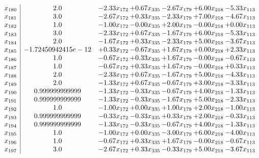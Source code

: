 \documentclass[8pt]{article}
\begin{document}
\[\begin{array}{c| c c@{\hskip 2pt} c@{\hskip 2pt} c@{\hskip 2pt} c@{\hskip 2pt} c@{\hskip 2pt} }
 x_{180}   &  2.0 & -2.33 x_{172} & +  0.67 x_{335} & -2.67 x_{179} & +  6.00 x_{218} & -5.33 x_{113}\\
 x_{181}   &  3.0 & -2.67 x_{172} & +  0.33 x_{335} & -2.33 x_{179} & +  7.00 x_{218} & -4.67 x_{113}\\
 x_{182}   &  1.0 & -1.00 x_{172} & -0.00 x_{335} & +  2.00 x_{179} & -0.00 x_{218} & +  0.00 x_{113}\\
 x_{183}   &  3.0 & -2.33 x_{172} & +  0.67 x_{335} & -1.67 x_{179} & +  6.00 x_{218} & -5.33 x_{113}\\
 x_{184}   &  2.0 & -1.67 x_{172} & +  0.33 x_{335} & -2.33 x_{179} & +  5.00 x_{218} & -3.67 x_{113}\\
 x_{185}   &  -1.72450942415e-12 & +  0.33 x_{172} & -0.67 x_{335} & +  1.67 x_{179} & +  0.00 x_{218} & +  2.33 x_{113}\\
 x_{186}   &  1.0 & -0.67 x_{172} & +  0.33 x_{335} & +  1.67 x_{179} & -0.00 x_{218} & -0.67 x_{113}\\
 x_{187}   &  1.0 & -0.67 x_{172} & +  0.33 x_{335} & +  1.67 x_{179} & -0.00 x_{218} & +  0.33 x_{113}\\
 x_{188}   &  2.0 & -2.33 x_{172} & +  0.67 x_{335} & -1.67 x_{179} & +  5.00 x_{218} & -4.33 x_{113}\\
 x_{189}   &  2.0 & -1.33 x_{172} & +  0.67 x_{335} & -0.67 x_{179} & +  3.00 x_{218} & -3.33 x_{113}\\
 x_{190}   &  0.999999999999 & -1.33 x_{172} & -0.33 x_{335} & -0.67 x_{179} & +  4.00 x_{218} & -1.33 x_{113}\\
 x_{191}   &  0.999999999999 & -1.33 x_{172} & -0.33 x_{335} & -1.67 x_{179} & +  5.00 x_{218} & -2.33 x_{113}\\
 x_{192}   &  1.0 & -1.00 x_{172} & +  0.00 x_{335} & +  1.00 x_{179} & +  2.00 x_{218} & -1.00 x_{113}\\
 x_{193}   &  0.999999999999 & -0.33 x_{172} & -0.33 x_{335} & +  0.33 x_{179} & +  2.00 x_{218} & -0.33 x_{113}\\
 x_{194}   &  0.999999999999 & -1.33 x_{172} & -0.33 x_{335} & -0.67 x_{179} & +  4.00 x_{218} & -1.33 x_{113}\\
 x_{195}   &  1.0 & -1.00 x_{172} & +  0.00 x_{335} & -3.00 x_{179} & +  6.00 x_{218} & -4.00 x_{113}\\
 x_{196}   &  1.0 & -0.67 x_{172} & +  0.33 x_{335} & +  1.67 x_{179} & -0.00 x_{218} & -0.67 x_{113}\\
 x_{197}   &  3.0 & -2.67 x_{172} & +  0.33 x_{335} & -0.33 x_{179} & +  5.00 x_{218} & -3.67 x_{113}\\

\end{array}\]
\end{document}
